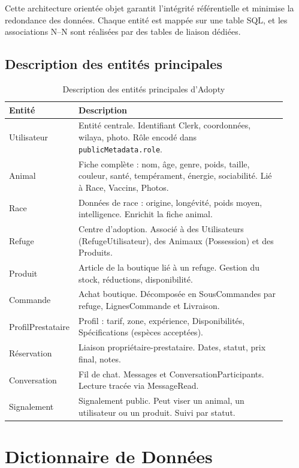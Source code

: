 \documentclass[12pt,a4paper]{report}
\begin{document}
Cette architecture orientée objet garantit l'intégrité référentielle et minimise la redondance des données. Chaque entité est mappée sur une table SQL, et les associations N--N sont réalisées par des tables de liaison dédiées.

\subsection{Description des entités principales}

\begin{table}[H]
\centering
\begin{tabular}{@{}L{0.18\linewidth}L{0.74\linewidth}@{}}
\toprule
\textbf{Entité} & \textbf{Description} \\
\midrule
Utilisateur & Entité centrale. Identifiant Clerk, coordonnées, wilaya, photo. Rôle encodé dans \texttt{publicMetadata.role}. \\[3pt]
Animal & Fiche complète : nom, âge, genre, poids, taille, couleur, santé, tempérament, énergie, sociabilité. Lié à Race, Vaccins, Photos. \\[3pt]
Race & Données de race : origine, longévité, poids moyen, intelligence. Enrichit la fiche animal. \\[3pt]
Refuge & Centre d'adoption. Associé à des Utilisateurs (RefugeUtilisateur), des Animaux (Possession) et des Produits. \\[3pt]
Produit & Article de la boutique lié à un refuge. Gestion du stock, réductions, disponibilité. \\[3pt]
Commande & Achat boutique. Décomposée en SousCommandes par refuge, LignesCommande et Livraison. \\[3pt]
ProfilPrestataire & Profil : tarif, zone, expérience, Disponibilités, Spécifications (espèces acceptées). \\[3pt]
Réservation & Liaison propriétaire-prestataire. Dates, statut, prix final, notes. \\[3pt]
Conversation & Fil de chat. Messages et ConversationParticipants. Lecture tracée via MessageRead. \\[3pt]
Signalement & Signalement public. Peut viser un animal, un utilisateur ou un produit. Suivi par statut. \\
\bottomrule
\end{tabular}
\caption{Description des entités principales d'Adopty}
\label{tab:entites}
\end{table}

\section{Dictionnaire de Données}
\end{document}
